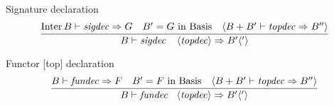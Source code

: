 \begin{inference-rule}{Signature declaration}
\begin{equation}\label{rule:dynamic-modules:signature-declaration}
\vcenter{\infer{\B\ts\sigdecintopdec\ra \B'\optional{'}}
  {\Inter\B\ts\sigdec\ra\G
    & B' = \G\ \In\ \Basis
    & \optional{ \B + \B'\ts\topdec\ra\B''}}}
\end{equation}
\end{inference-rule}

\begin{inference-rule}{Functor [top] declaration}
\begin{equation}\label{rule:dynamic-modules:functor-top-declaration}
\vcenter{\infer{\B\ts\fundecintopdec\ra\B'\optional{'}}
  {\B\ts\fundec\ra\F
    & \B' = \F\ \In\ \Basis
    & \optional{ \B + \B'\ts\topdec\ra\B''}}}
\end{equation}
\end{inference-rule}